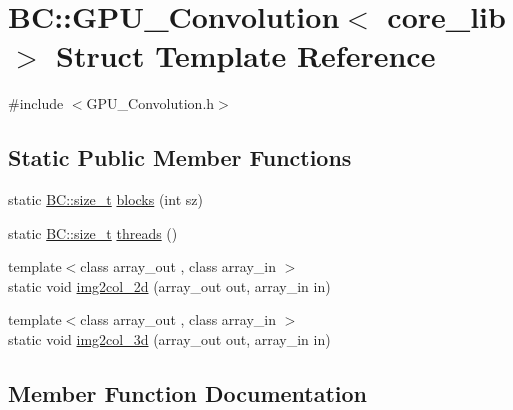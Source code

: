 \hypertarget{structBC_1_1GPU__Convolution}{}\section{BC\+:\+:G\+P\+U\+\_\+\+Convolution$<$ core\+\_\+lib $>$ Struct Template Reference}
\label{structBC_1_1GPU__Convolution}


{\ttfamily \#include $<$G\+P\+U\+\_\+\+Convolution.\+h$>$}

\subsection*{Static Public Member Functions}
\begin{DoxyCompactItemize}
\item 
static \hyperlink{namespaceBC_a6007cbc4eeec401a037b558910a56173}{B\+C\+::size\+\_\+t} \hyperlink{structBC_1_1GPU__Convolution_a32e52492cad93fcda4f499a2aa1fcfc8}{blocks} (int sz)
\item 
static \hyperlink{namespaceBC_a6007cbc4eeec401a037b558910a56173}{B\+C\+::size\+\_\+t} \hyperlink{structBC_1_1GPU__Convolution_a8065fe897ea8cc29d469e286dedd3cb2}{threads} ()
\item 
{\footnotesize template$<$class array\+\_\+out , class array\+\_\+in $>$ }\\static void \hyperlink{structBC_1_1GPU__Convolution_a515f09f247e1367af7af4ef9acae5f29}{img2col\+\_\+2d} (array\+\_\+out out, array\+\_\+in in)
\item 
{\footnotesize template$<$class array\+\_\+out , class array\+\_\+in $>$ }\\static void \hyperlink{structBC_1_1GPU__Convolution_a00d69613bdc9403ac4b49b6e5185824a}{img2col\+\_\+3d} (array\+\_\+out out, array\+\_\+in in)
\end{DoxyCompactItemize}


\subsection{Member Function Documentation}
